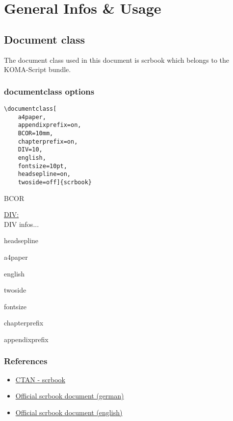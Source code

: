 \newline

\pagediagram

\section{General Infos \& Usage}
\subsection{Document class}
The document class used in this document is scrbook which belongs to the
KOMA-Script bundle.
\subsubsection{documentclass options}
\begin{singlespace}
\begin{lstlisting}[style=cstm-lists-latex-sty]
\documentclass[
    a4paper,
    appendixprefix=on,
    BCOR=10mm,
    chapterprefix=on,
    DIV=10,
    english,
    fontsize=10pt,
    headsepline=on,
    twoside=off]{scrbook}
\end{lstlisting}
\end{singlespace}
\begin{twitemize}
    \item{BCOR}
    \item{\href{http://mirrors.ibiblio.org/CTAN/macros/latex/contrib/koma-script/doc/scrguide.pdf\#desc:typearea.option.DIV}{DIV:}\\
        DIV infos...}
    \item{headsepline}
    \item{a4paper}
    \item{english}
    \item{twoside}
    \item{fontsize}
    \item{chapterprefix}
    \item{appendixprefix}
\end{twitemize}
\subsubsection{References}
\begin{itemize}
    \item{\href{https://ctan.org/pkg/scrbook}{CTAN - scrbook}}
    \item{\href{http://www.pirbot.com/mirrors/ctan/macros/latex/contrib/koma-script/doc/scrguide.pdf}{Official scrbook document (german)}}
    \item{\href{http://www.pirbot.com/mirrors/ctan/macros/latex/contrib/koma-script/doc/scrguien.pdf}{Official scrbook document (english)}}
\end{itemize}

